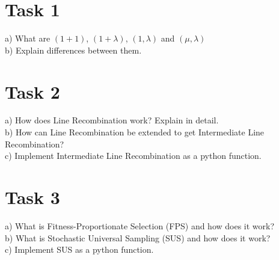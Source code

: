 \documentclass[12pt,letterpaper]{article}
\begin{document}
\section*{Task 1}
a) What are $(1+1)$, $(1 + \lambda)$, $(1,\lambda)$ and $(\mu,\lambda)$\\

b) Explain differences between them. 


\section*{Task 2}
a) How does Line Recombination work? Explain in detail. \\

b)  How can Line Recombination be extended to get Intermediate Line Recombination? \\

c)  Implement Intermediate Line Recombination as a python function.

\section*{Task 3}
a)  What is Fitness-Proportionate Selection (FPS) and how does it work? \\

b)  What is Stochastic Universal Sampling (SUS) and how does it work? \\

c)  Implement SUS as a python function.
\end{document}
